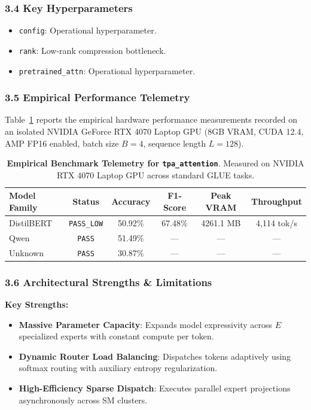 \subsubsection*{3.4 Key Hyperparameters}
\begin{itemize}
    \item \texttt{config}: Operational hyperparameter.
    \item \texttt{rank}: Low-rank compression bottleneck.
    \item \texttt{pretrained\_attn}: Operational hyperparameter.
\end{itemize}

\subsubsection*{3.5 Empirical Performance Telemetry}
Table~\ref{tab:telemetry_tpa_attention} reports the empirical hardware performance measurements recorded on an isolated NVIDIA GeForce RTX 4070 Laptop GPU (8GB VRAM, CUDA 12.4, AMP FP16 enabled, batch size $B=4$, sequence length $L=128$).

\begin{table}[h]
\centering
\small
\caption{\textbf{Empirical Benchmark Telemetry for \texttt{tpa\_attention}}. Measured on NVIDIA RTX 4070 Laptop GPU across standard GLUE tasks.}
\label{tab:telemetry_tpa_attention}
\begin{tabular*}{\columnwidth}{@{\extracolsep{\fill}}lccccc}
\toprule
\textbf{Model Family} & \textbf{Status} & \textbf{Accuracy} & \textbf{F1-Score} & \textbf{Peak VRAM} & \textbf{Throughput} \\
\midrule
DistilBERT & \texttt{PASS\_LOW} & 50.92\% & 67.48\% & 4261.1 MB & 4,114 tok/s \\
Qwen & \texttt{PASS} & 51.49\% & --- & --- & --- \\
Unknown & \texttt{PASS} & 30.87\% & --- & --- & --- \\
\bottomrule
\end{tabular*}
\end{table}

\subsubsection*{3.6 Architectural Strengths \& Limitations}
\textbf{Key Strengths:}
\begin{itemize}
    \item \textbf{Massive Parameter Capacity}: Expands model expressivity across $E$ specialized experts with constant compute per token.
    \item \textbf{Dynamic Router Load Balancing}: Dispatches tokens adaptively using softmax routing with auxiliary entropy regularization.
    \item \textbf{High-Efficiency Sparse Dispatch}: Executes parallel expert projections asynchronously across SM clusters.
\end{itemize}

